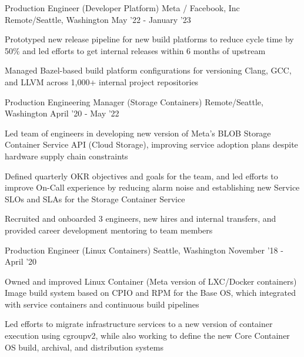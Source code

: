 \def\title{\color{solarized-cyan}Job\color{solarized-violet}(Log)}

\cvsection{\title{}{}}
\begin{cventries}
\cventry
	{Production Engineer \color{solarized-orange}(Developer Platform)} %
	{Meta / Facebook, Inc} %
    {Remote/Seattle, Washington} %
    {May '22 - January '23} %
    {
        \begin{cvitems}
		  \item Prototyped new release pipeline for new build platforms to reduce cycle time by 50\% and led efforts to get internal releases within 6 months of upstream
		  \item Managed Bazel-based build platform configurations for versioning Clang, GCC, and LLVM across 1,000+ internal project repositories
        \end{cvitems}
    }
\vspace{0mm}
\cventry
	{Production Engineering Manager \color{solarized-orange}(Storage Containers)} %
    {} %
    {Remote/Seattle, Washington} %
    {April '20 - May '22} %
    {
        \begin{cvitems}
		  \item Led team of engineers in developing new version of Meta's BLOB Storage Container Service API (Cloud Storage), improving service adoption plans despite hardware supply chain constraints
		  \item Defined quarterly OKR objectives and goals for the team, and led efforts to improve On-Call experience by reducing alarm noise and establishing new Service SLOs and SLAs for the Storage Container Service
		  \item Recruited and onboarded 3 engineers, new hires and internal transfers, and provided career development mentoring to team members
        \end{cvitems}
    }
\vspace{0mm}
\cventry
	{Production Engineer \color{solarized-orange}(Linux Containers)} %
    {} %
    {Seattle, Washington} %
    {November '18 - April '20} %
    {
        \begin{cvitems}
	      \item Owned and improved Linux Container (Meta version of LXC/Docker containers) Image build system based on CPIO and RPM for the Base OS, which integrated with service containers and continuous build pipelines
		  \item Led efforts to migrate infrastructure services to a new version of container execution using cgroupv2, while also working to define the new Core Container OS build, archival, and distribution systems

\end{cvitems}}
\end{cventries}
